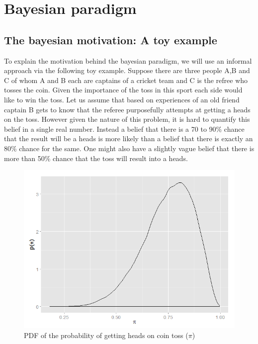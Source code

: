
\chapter{Bayesian paradigm}
\label{ch : bayesian_paradigm}

\section{The bayesian motivation: A toy example}
To explain the motivation behind the bayesian paradigm, we will use an informal approach via the following toy example. Suppose there are three people A,B and C of whom A and B each are captains of a cricket team and C is the refree who tosses the coin. Given the importance of the toss in this sport each side would like to win the toss. Let us assume that based on experiences of an old friend captain B gets to know that the referee purposefully attempts at getting a heads on the toss. However given the nature of this problem, it is hard to quantify this belief in a single real number. Instead a belief that there is a 70 to 90\% chance that the result will be a heads is more likely than a belief that there is exactly an 80\% chance for the same. One might also have a slightly vague belief that there is more than 50\% chance that the toss will result into a heads. \\

\begin{figure}
	\centering
	\includegraphics[scale=0.5]{mainmatter/chapter_2_bayesian_paradigm/toy_problem_pdf.png}
	\caption{PDF of the probability of getting heads on coin toss ($\pi$)}
	\label{fig : toy_problem_pdf}
\end{figure}



